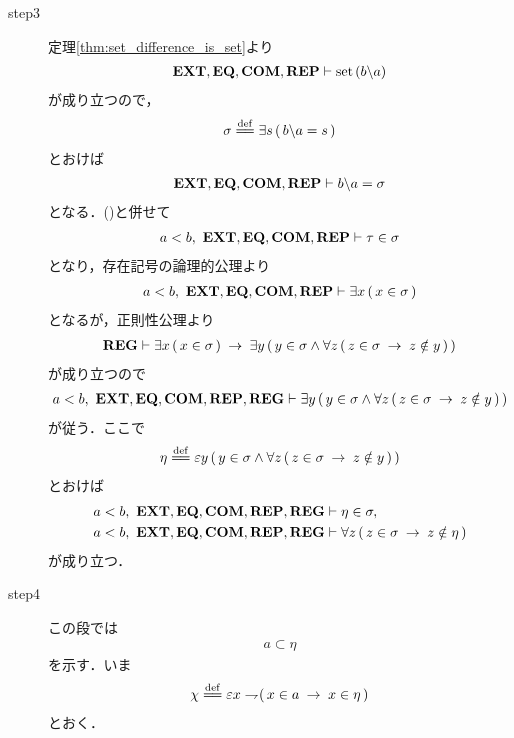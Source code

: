 \begin{prf}
\begin{description}
			\item[step3] 定理\ref{thm:set_difference_is_set}より
				\begin{align}
					\mbox{{\bf EXT}},\mbox{{\bf EQ}},\mbox{\bf COM},\mbox{{\bf REP}} \vdash \operatorname*{set}\hspace{0.15em}(b \backslash a)
				\end{align}
				が成り立つので，
				\begin{align}
					\sigma \defeq \exists s\, (\, b \backslash a = s\, )
				\end{align}
				とおけば
				\begin{align}
					\mbox{{\bf EXT}},\mbox{{\bf EQ}},\mbox{\bf COM},\mbox{{\bf REP}} \vdash b \backslash a = \sigma
					\label{fom:element_and_proper_subset_correspond_8}
				\end{align}
				となる．()と併せて
				\begin{align}
					a < b,\ \mbox{{\bf EXT}},\mbox{{\bf EQ}},\mbox{\bf COM},\mbox{{\bf REP}} \vdash \tau \in \sigma
				\end{align}
				となり，存在記号の論理的公理より
				\begin{align}
					a < b,\ \mbox{{\bf EXT}},\mbox{{\bf EQ}},\mbox{\bf COM},\mbox{{\bf REP}} \vdash \exists x\, (\, x \in \sigma\, )
				\end{align}
				となるが，正則性公理より
				\begin{align}
					\mbox{{\bf REG}} \vdash \exists x\, (\, x \in \sigma\, ) 
					\hspace{0.25em}\rightarrow\hspace{0.25em} \exists y\, (\, y \in \sigma \wedge \forall z\, (\, z \in \sigma \hspace{0.25em}\rightarrow\hspace{0.25em} z \notin y\, )\, )
				\end{align}
				が成り立つので
				\begin{align}
					a < b,\ \mbox{{\bf EXT}},\mbox{{\bf EQ}},\mbox{\bf COM},\mbox{{\bf REP}},\mbox{{\bf REG}} \vdash 
					\exists y\, (\, y \in \sigma \wedge \forall z\, (\, z \in \sigma \hspace{0.25em}\rightarrow\hspace{0.25em} z \notin y\, )\, )
				\end{align}
				が従う．ここで
				\begin{align}
					\eta \defeq \varepsilon y\, (\, y \in \sigma \wedge 
					\forall z\, (\, z \in \sigma \rarrow z \notin y\, )\, )
				\end{align}
				とおけば
				\begin{align}
					a < b,\ \mbox{{\bf EXT}},\mbox{{\bf EQ}},\mbox{\bf COM},\mbox{{\bf REP}},\mbox{{\bf REG}} &\vdash \eta \in \sigma, 
					\label{fom:element_and_proper_subset_correspond_9} \\
					a < b,\ \mbox{{\bf EXT}},\mbox{{\bf EQ}},\mbox{\bf COM},\mbox{{\bf REP}},\mbox{{\bf REG}} &\vdash 
					\forall z\, (\, z \in \sigma \hspace{0.25em}\rightarrow\hspace{0.25em} z \notin \eta\, )
					\label{fom:element_and_proper_subset_correspond_10}
				\end{align}
				が成り立つ．
				
			\item[step4] この段では
				\begin{align}
					a \subset \eta 
				\end{align}
				を示す．いま
				\begin{align}
					\chi \defeq \varepsilon x \negation (\, x \in a \rarrow x \in \eta\, )
				\end{align}
				とおく．
		\end{description}
		

\end{prf}
